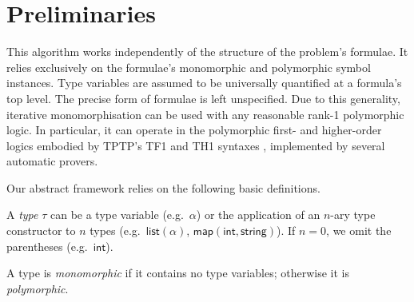 \documentclass[]{ceurart}
\newcommand\ty[1]{\textsf{#1}}
\begin{document}
\section{Preliminaries}
\label{sec:preliminaries}

This algorithm works independently of the structure of the problem's formulae. It relies exclusively on the formulae's monomorphic and polymorphic symbol instances. Type variables are assumed to be universally quantified at a formula's top level. The precise form of formulae is left unspecified.
%
Due to this generality, iterative monomorphisation can be used with any reasonable rank-1 polymorphic logic. In particular, it can operate in the polymorphic first- and higher-order logics embodied by TPTP's TF1 and TH1 syntaxes \cite{blanchette-paskevich-2013,th1}, implemented by several automatic provers.


%
%
%


Our abstract framework relies on the following basic definitions.

\begin{definition}%
A \emph{type} \(\tau\) can be a type variable (e.g.\ \(\alpha\)) or
the application of an \(n\)-ary type constructor to \(n\) types (e.g.\ \(\ty{list}(\alpha)\), \(\ty{map}(\ty{int},\ty{string})\)).
If $n = 0$, we omit the parentheses (e.g.\ \(\ty{int}\)).
\end{definition}

\begin{definition}%
A type is \emph{monomorphic} if it contains no type variables; otherwise it is \emph{polymorphic}.
\end{definition}
\end{document}
